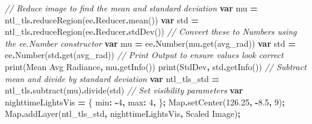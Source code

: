 \documentclass[
]{article}
\newenvironment{Shaded}{\begin{snugshade}}{\end{snugshade}}
\newcommand{\AttributeTok}[1]{\textcolor[rgb]{0.77,0.63,0.00}{#1}}
\newcommand{\BuiltInTok}[1]{#1}
\newcommand{\CommentTok}[1]{\textcolor[rgb]{0.56,0.35,0.01}{\textit{#1}}}
\newcommand{\DataTypeTok}[1]{\textcolor[rgb]{0.13,0.29,0.53}{#1}}
\newcommand{\DecValTok}[1]{\textcolor[rgb]{0.00,0.00,0.81}{#1}}
\newcommand{\FloatTok}[1]{\textcolor[rgb]{0.00,0.00,0.81}{#1}}
\newcommand{\FunctionTok}[1]{\textcolor[rgb]{0.00,0.00,0.00}{#1}}
\newcommand{\KeywordTok}[1]{\textcolor[rgb]{0.13,0.29,0.53}{\textbf{#1}}}
\newcommand{\NormalTok}[1]{#1}
\newcommand{\OperatorTok}[1]{\textcolor[rgb]{0.81,0.36,0.00}{\textbf{#1}}}
\newcommand{\StringTok}[1]{\textcolor[rgb]{0.31,0.60,0.02}{#1}}
\begin{document}
\begin{Shaded}
\begin{Highlighting}[]
\CommentTok{// Reduce image to find the mean and standard deviation}
\KeywordTok{var}\NormalTok{ mu }\OperatorTok{=}\NormalTok{ ntl\_tls}\OperatorTok{.}\FunctionTok{reduceRegion}\NormalTok{(ee}\OperatorTok{.}\AttributeTok{Reducer}\OperatorTok{.}\FunctionTok{mean}\NormalTok{())}
\KeywordTok{var}\NormalTok{ std }\OperatorTok{=}\NormalTok{ ntl\_tls}\OperatorTok{.}\FunctionTok{reduceRegion}\NormalTok{(ee}\OperatorTok{.}\AttributeTok{Reducer}\OperatorTok{.}\FunctionTok{stdDev}\NormalTok{())}
\CommentTok{// Convert these to Numbers using the ee.Number constructor}
\KeywordTok{var}\NormalTok{ mu }\OperatorTok{=}\NormalTok{ ee}\OperatorTok{.}\FunctionTok{Number}\NormalTok{(mu}\OperatorTok{.}\FunctionTok{get}\NormalTok{(}\StringTok{\textquotesingle{}avg\_rad\textquotesingle{}}\NormalTok{))}
\KeywordTok{var}\NormalTok{ std }\OperatorTok{=}\NormalTok{ ee}\OperatorTok{.}\FunctionTok{Number}\NormalTok{(std}\OperatorTok{.}\FunctionTok{get}\NormalTok{(}\StringTok{\textquotesingle{}avg\_rad\textquotesingle{}}\NormalTok{))}
\CommentTok{// Print Output to ensure values look correct}
\FunctionTok{print}\NormalTok{(}\StringTok{\textquotesingle{}Mean Avg Radiance\textquotesingle{}}\OperatorTok{,}\NormalTok{ mu}\OperatorTok{.}\FunctionTok{getInfo}\NormalTok{())}
\FunctionTok{print}\NormalTok{(}\StringTok{\textquotesingle{}StdDev\textquotesingle{}}\OperatorTok{,}\NormalTok{ std}\OperatorTok{.}\FunctionTok{getInfo}\NormalTok{())}
\CommentTok{// Subtract mean and divide by standard deviation}
\KeywordTok{var}\NormalTok{ ntl\_tls\_std }\OperatorTok{=}\NormalTok{ ntl\_tls}\OperatorTok{.}\FunctionTok{subtract}\NormalTok{(mu)}\OperatorTok{.}\FunctionTok{divide}\NormalTok{(std)}
\CommentTok{// Set visibility parameters}
\KeywordTok{var}\NormalTok{ nighttimeLightsVis }\OperatorTok{=}\NormalTok{ \{}
  \DataTypeTok{min}\OperatorTok{:} \OperatorTok{{-}}\DecValTok{4}\OperatorTok{,}
  \DataTypeTok{max}\OperatorTok{:} \DecValTok{4}\OperatorTok{,}
\NormalTok{\}}\OperatorTok{;}
\BuiltInTok{Map}\OperatorTok{.}\FunctionTok{setCenter}\NormalTok{(}\FloatTok{126.25}\OperatorTok{,} \OperatorTok{{-}}\FloatTok{8.5}\OperatorTok{,} \DecValTok{9}\NormalTok{)}\OperatorTok{;}
\BuiltInTok{Map}\OperatorTok{.}\FunctionTok{addLayer}\NormalTok{(ntl\_tls\_std}\OperatorTok{,}\NormalTok{ nighttimeLightsVis}\OperatorTok{,} \StringTok{\textquotesingle{}Scaled Image\textquotesingle{}}\NormalTok{)}\OperatorTok{;}
\end{Highlighting}
\end{Shaded}
\end{document}
